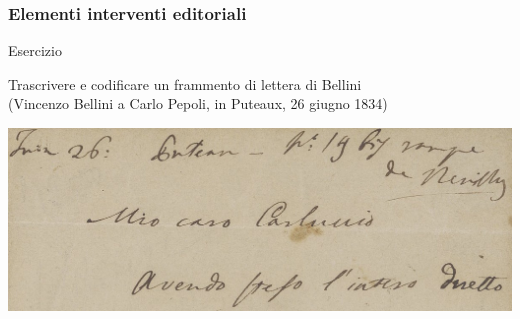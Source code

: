 \begin{frame}
    \frametitle{Elementi interventi editoriali}
    \addtocounter{nframe}{1}
    
   
    \begin{block}{Esercizio}
        \begin{center}
            Trascrivere e codificare un frammento di lettera di Bellini
            \\(Vincenzo Bellini a Carlo Pepoli, in Puteaux, 26 giugno 1834)
        \end{center}
    \end{block}
    \begin{center}
        \includegraphics[width=.8\textwidth]{imgs/letteraBellini-1a-LL_1_16.jpg}
    \end{center}
\end{frame}
